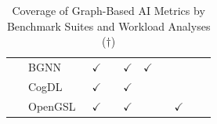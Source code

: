 \begin{landscape}
\begin{table}[htbp]
\begin{tabular}{ll|cccccccc}
               {\footnotesize ~              }  & {\footnotesize BGNN~\cite{Dwivedi2023}                 }      & $\checkmark$  &              & $\checkmark$  & $\checkmark$  &               &               &               &               \\
               {\footnotesize ~              }  & {\footnotesize CogDL~\cite{Cen2023}                    }      & $\checkmark$  &              & $\checkmark$  &               &               &               &               &               \\
               {\footnotesize ~              }  & {\footnotesize OpenGSL~\cite{Zhou2024}               }        & $\checkmark$  &              & $\checkmark$  &               &               & $\checkmark$  &               &               \\
        \end{tabular}
        \caption{Coverage of Graph-Based AI Metrics by Benchmark Suites and Workload Analyses ($\dagger$)}
        \label{table:benchmark-metrics}
    \end{table}
\end{landscape}


